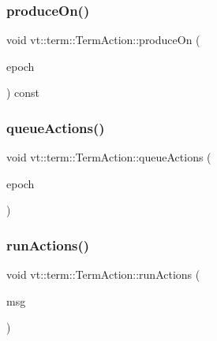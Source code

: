 \mbox{\label{structvt_1_1term_1_1_term_action_a7022e4c4db4cffc376f8c228b32deee8}} 
\subsubsection{\texorpdfstring{produce\+On()}{produceOn()}}
{\footnotesize\ttfamily void vt\+::term\+::\+Term\+Action\+::produce\+On (\begin{DoxyParamCaption}\item[{\hyperlink{namespacevt_a81d11b28122d43bf9834577e4a06440f}{Epoch\+Type}}]{epoch }\end{DoxyParamCaption}) const}

\mbox{\label{structvt_1_1term_1_1_term_action_a12fe44411dad9ec9564adb12ed82a35f}} 
\subsubsection{\texorpdfstring{queue\+Actions()}{queueActions()}}
{\footnotesize\ttfamily void vt\+::term\+::\+Term\+Action\+::queue\+Actions (\begin{DoxyParamCaption}\item[{\hyperlink{namespacevt_a81d11b28122d43bf9834577e4a06440f}{Epoch\+Type}}]{epoch }\end{DoxyParamCaption})\hspace{0.3cm}{\ttfamily [protected]}}

\mbox{\label{structvt_1_1term_1_1_term_action_a13f4ee69a6e01f65de03320904737c64}} 
\subsubsection{\texorpdfstring{run\+Actions()}{runActions()}}
{\footnotesize\ttfamily void vt\+::term\+::\+Term\+Action\+::run\+Actions (\begin{DoxyParamCaption}\item[{\hyperlink{structvt_1_1term_1_1_term_action_1_1_action_msg}{Action\+Msg} $\ast$}]{msg }\end{DoxyParamCaption})\hspace{0.3cm}{\ttfamily [static]}}

